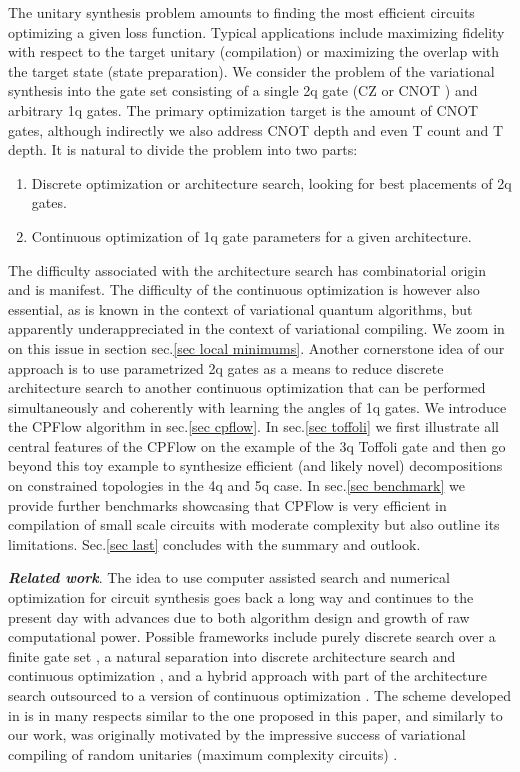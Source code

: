 \documentclass[twocolumn, amsfonts, amssymb, aps, nofootinbib]{revtex4-2}
\newcommand{\CZ}{CZ }
\newcommand{\CX}{CNOT }
\newcommand{\T}{T }
\newcommand{\package}[1]{\textrm {#1 }}
\newcommand{\cpflow}{\package{CPFlow}}
\begin{document}
The unitary synthesis problem amounts to finding the most efficient circuits optimizing a given loss function. Typical applications include maximizing fidelity with respect to the target unitary (compilation) or maximizing the overlap with the target state (state preparation). We consider the problem of the variational synthesis into the gate set consisting of a single 2q gate (\CZ or \CX) and arbitrary 1q gates. The primary optimization target is the amount of \CX gates, although indirectly we also address \CX depth and even \T count and \T depth. It is natural to divide the problem into two parts:
\begin{enumerate}[label=(\roman*), nosep]
	\item Discrete optimization or architecture search, looking for best placements of 2q gates.
	\item Continuous optimization of 1q gate parameters for a given architecture.
\end{enumerate}
The difficulty associated with the architecture search has combinatorial origin and is manifest. The difficulty of the continuous optimization is however also essential, as is known in the context of variational quantum algorithms, but apparently underappreciated in the context of variational compiling. We zoom in on this issue in section sec.\ref{sec local minimums}. Another cornerstone idea of our approach is to use parametrized 2q gates as a means to reduce discrete architecture search to another continuous optimization that can be performed simultaneously and coherently with learning the angles of 1q gates. We introduce the \cpflow algorithm in sec.\ref{sec cpflow}. In sec.\ref{sec toffoli} we first illustrate all central features of the \cpflow on the example of the 3q Toffoli gate and then go beyond this toy example to synthesize efficient (and likely novel) decompositions on constrained topologies in the 4q and 5q case. In sec.\ref{sec benchmark} we provide further benchmarks showcasing that \cpflow is very efficient in compilation of small scale circuits with moderate complexity but also outline its limitations. Sec.\ref{sec last} concludes with the summary and outlook.

\textbf{\textit{Related work}}. The idea to use computer assisted search and numerical optimization for circuit synthesis goes back a long way \cite{Divincenzo1994} and continues to the present day with advances due to both algorithm design and growth of raw computational power. Possible frameworks include purely discrete search over a finite gate set \cite{Nagarajan2021}, a natural separation into discrete architecture search and continuous optimization \cite{Nam2018, Khatri2019, Smith2021}, and a hybrid approach with part of the architecture search outsourced to a version of continuous optimization \cite{Younis2021, Rakyta2022}. The scheme developed in \cite{Rakyta2022} is in many respects similar to the one proposed in this paper, and similarly to our work, was originally motivated by the impressive success of variational compiling of random unitaries (maximum complexity circuits) \cite{Kiani2020, Madden2021, Rakyta2021}. 
\end{document}
